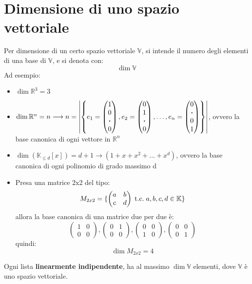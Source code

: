 \documentclass[a4paper,12pt]{article}
\begin{document}
	\section{Dimensione di uno spazio vettoriale}
	Per dimensione di un certo spazio vettoriale $\mathbb{V}$, si intende il numero degli elementi di una base di $\mathbb{V}$, e si denota con:
	\[\dim \mathbb{V}\]
	Ad esempio:
	\begin{itemize}
		\item $\dim \mathbb{R}^3 = 3$
		\item $\dim \mathbb{R}^n = n \longrightarrow n = \left|\left\{e_1 = \begin{pmatrix} 1 \\ 0 \\ \vdot \\ 0 \end{pmatrix}, e_2 = \begin{pmatrix} 0 \\ 1 \\ \vdot \\ 0 \end{pmatrix}, \dots , e_n = \begin{pmatrix} 0 \\ \vdot  \\ 0 \\ 1 \end{pmatrix}\right\}\right|$, ovvero la base canonica di ogni vettore in $\mathbb{R}^n$
		\item $\dim (\mathbb{K}_{\leq d} [x]) = d + 1 \longrightarrow (1 + x + x^2 + \dots + x^d)$, ovvero la base canonica di ogni polinomio di grado massimo d
		\item Presa una matrice 2x2 del tipo:
		\[M_{2x2} = \{\begin{pmatrix} a & b \\ c & d \end{pmatrix} \;\text{t.c.}\; a,b,c,d \in \mathbb{K}\}\]
		allora la base canonica di una matrice due per due è:
		\[\begin{pmatrix} 1 & 0 \\ 0 & 0 \end{pmatrix}, \begin{pmatrix} 0 & 1 \\ 0 & 0 \end{pmatrix}, \begin{pmatrix} 0 & 0 \\ 1 & 0 \end{pmatrix}, \begin{pmatrix} 0 & 0 \\ 0 & 1 \end{pmatrix}\]
		quindi:
		\[\dim M_{2x2} = 4\]
	\end{itemize}
	Ogni lista \textbf{linearmente indipendente}, ha al massimo $\dim \mathbb{V}$ elementi, dove $\mathbb{V}$ è uno spazio vettoriale.
	
\end{document}
